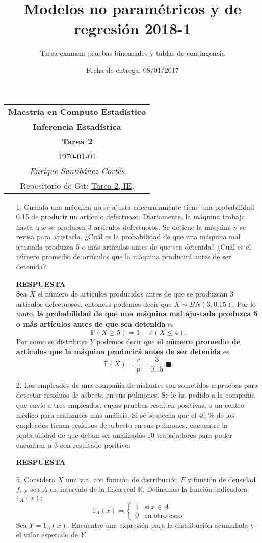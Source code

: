 \documentclass[11pt,letterpaper]{article}
\title{Modelos no paramétricos y de regresión 2018-1}
\author{Tarea examen: pruebas binomiales y tablas de contingencia}
\date{Fecha de entrega: 08/01/2017}
\newcommand{\mP}{\mathbb{P}}
\newcommand{\mE}{\mathbb{E}}
\newcommand{\res}{\textbf{RESPUESTA}\\}
\newcommand{\finf}{\blacksquare.}
\begin{document}
\begin{table}[ht]
\centering
\begin{tabular}{c}
\textbf{Maestría en Computo Estadístico}\\
\textbf{Inferencia Estadística} \\
\textbf{Tarea 2}\\
\today \\
\emph{Enrique Santibáñez Cortés}\\
Repositorio de Git: \href{https://github.com/Enriquesec/Inferencia_Estad-stica/tree/master/Tareas/Tarea_2}{Tarea 2, IE}.
\end{tabular}
\end{table}

\begin{itemize}
\item[1.] Cuando una máquina no se ajusta adecuadamente tiene una probabilidad 0.15 de producir un artículo defectuoso. Diariamente, la máquina trabaja hasta que se producen 3 artículos defectuosos. Se detiene la máquina y se revisa para ajustarla. ¿Cuál es la probabilidad de que una máquina mal ajustada produzca 5 o más artículos antes de que sea detenida? ¿Cuál es el número promedio de artículos que la máquina producirá antes de ser detenida?

\res
Sea $X$ el número de artículos producidos antes de que se produzcan 3 artículos defectuosos, entonces podemos decir que $X\sim BN(3,0.15).$ Por lo tanto, \textbf{la probabilidad de que una máquina mal ajustada produzca 5 o más artículos antes de que sea detenida} es
$$\mP(X\geq 5) =1-\mP(X\leq 4).$$
Por como se distribuye $Y$ podemos decir que \textbf{el número promedio de artículos que la máquina producirá antes de ser detenida} es
$$\mE(X)=\frac{r}{p}=\frac{3}{0.15}. \finf$$

\item[2.] Los empleados de una compañía de aislantes son sometidos a pruebas para detectar residuos de asbesto en sus pulmones. Se le ha pedido a la compañía que envíe a tres empleados, cuyas pruebas resulten positivas, a un centro médico para realizarles más análisis. Si se sospecha que el 40 \% de los empleados tienen residuos de asbesto en sus pulmones, encuentre la probabilidad de que deban ser analizados 10 trabajadores para poder encontrar a 3 con resultado positivo.

\res

\item[5.] Considera $X$ una v.a. con función de distribución $F$ y función de densidad $f$, y sea $A$ un intervalo de la línea real $\mathbb{R}$. Definamos la función indicadora $1_{A}(x):$
\begin{equation*}
1_{A}(x) = \left\{\begin{array}{ccr}
1 & \text{si} \ x\in A\\
0 & \text{en otro caso}
\end{array}\right.
\end{equation*}
Sea $Y=1_{A}(x).$ Encuentre una expresión para la distribución acumulada y el valor esperado de $Y$. 


\end{itemize}
\end{document}
